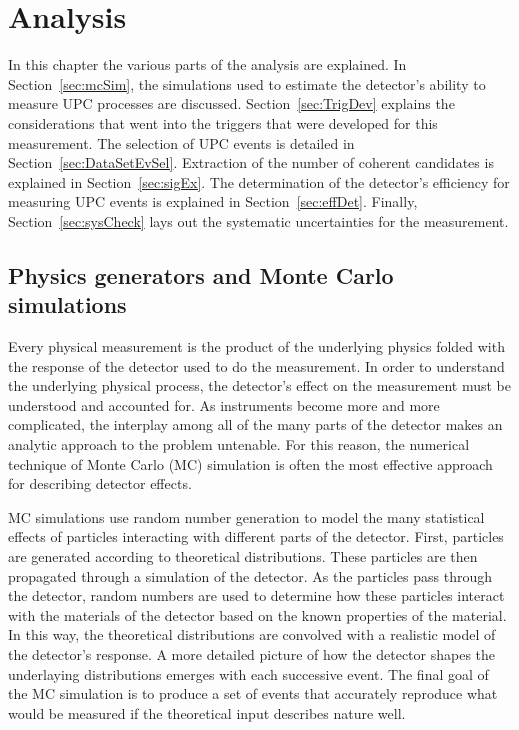 \chapter{\label{ch:analysis} Analysis}
  In this chapter the various parts of the analysis are explained. 
  In Section~\ref{sec:mcSim}, the simulations used to estimate the detector's 
    ability to measure UPC processes are discussed. 
  Section~\ref{sec:TrigDev} explains the considerations that went into the 
    triggers that were developed for this measurement.
  The selection of UPC events is detailed in Section~\ref{sec:DataSetEvSel}.
  Extraction of the number of coherent \JPsi{} candidates is explained in 
    Section~\ref{sec:sigEx}.
  The determination of the detector's efficiency for measuring UPC events is 
    explained in Section~\ref{sec:effDet}.
  Finally, Section~\ref{sec:sysCheck} lays out the systematic uncertainties 
    for the measurement. 

  \section{\label{sec:mcSim} Physics generators and Monte Carlo simulations}
    Every physical measurement is the product of the underlying physics 
      folded with the response of the detector used to do the measurement. 
    In order to understand the underlying physical process, the detector's 
      effect on the measurement must be understood and accounted for. 
    As instruments become more and more complicated, the interplay among all
      of the many parts of the detector makes an analytic approach to the 
      problem untenable.
    For this reason, the numerical technique of Monte Carlo (MC) simulation is
      often the most effective approach for describing detector effects.

    MC simulations use random number generation to model the many statistical 
      effects of particles interacting with different parts of the detector. 
    First, particles are generated according to theoretical distributions.
    These particles are then propagated through a simulation of the detector.
    As the particles pass through the detector, random numbers are used
      to determine how these particles interact with the materials of the 
      detector based on the known properties of the material. 
    In this way, the theoretical distributions are convolved with a realistic 
      model of the detector's response. 
    A more detailed picture of how the detector shapes the underlaying 
      distributions emerges with each successive event.
    The final goal of the MC simulation is to produce a set of events that 
      accurately reproduce what would be measured if the theoretical input 
      describes nature well. 

